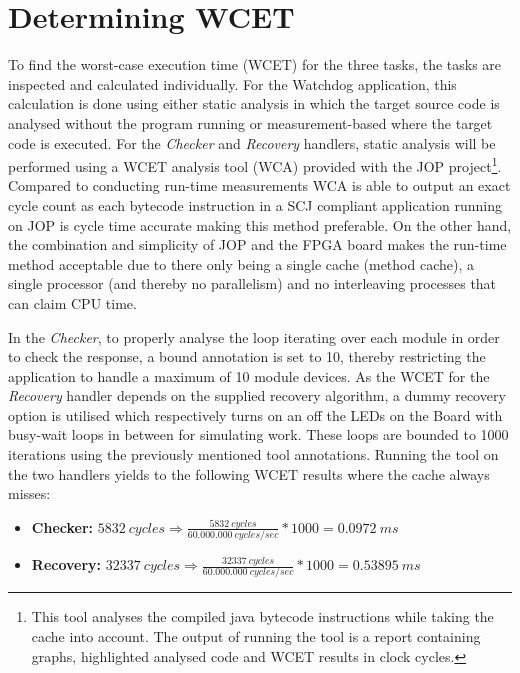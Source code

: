 \section{Determining WCET} %
\label{sec:determining_wcet}
To find the worst-case execution time (WCET) for the three tasks, the tasks are inspected and calculated individually. For the Watchdog application, this calculation is done using either static analysis in which the target source code is analysed without the program running or measurement-based where the target code is executed. For the \textit{Checker} and \textit{Recovery} handlers, static analysis will be performed using a WCET analysis tool (WCA) provided with the JOP project\footnote{This tool analyses the compiled java bytecode instructions while taking the cache into account. The output of running the tool is a report containing graphs, highlighted analysed code and WCET results in clock cycles.}. Compared to conducting run-time measurements WCA is able to output an exact cycle count as each bytecode instruction in a SCJ compliant application running on JOP is cycle time accurate making this method preferable. On the other hand, the combination and simplicity of JOP and the FPGA board makes the run-time method acceptable due to there only being a single cache (method cache), a single processor (and thereby no parallelism) and no interleaving processes that can claim CPU time.

In the \textit{Checker}, to properly analyse the loop iterating over each module in order to check the response, a bound annotation is set to 10, thereby restricting the application to handle a maximum of 10 module devices. As the WCET for the \textit{Recovery} handler depends on the supplied recovery algorithm, a dummy recovery option is utilised which respectively turns on an off the LEDs on the Board with busy-wait loops in between for simulating work. These loops are bounded to 1000 iterations using the previously mentioned tool annotations. Running the tool on the two handlers yields to the following WCET results where the cache always misses:
\begin{itemize}
    \item \textbf{Checker:} $5832\ cycles \Rightarrow \frac{5832\ cycles}{60.000.000\ cycles/sec} * 1000 = 0.0972\ ms$
    \item \textbf{Recovery:} $32337\ cycles \Rightarrow \frac{32337\ cycles}{60.000.000\ cycles/sec} * 1000 = 0.53895\ ms$
\end{itemize}

